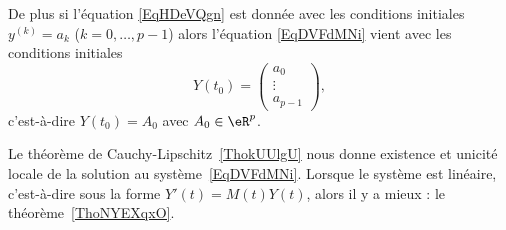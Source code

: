 De plus si l'équation \eqref{EqHDeVQgn} est donnée avec les conditions initiales \( y^{(k)}=a_k\) (\( k=0,\ldots, p-1\)) alors l'équation \eqref{EqDVFdMNi} vient avec les conditions initiales
\begin{equation}
	Y(t_0)=\begin{pmatrix}
		a_0    \\
		\vdots \\
		a_{p-1}
	\end{pmatrix},
\end{equation}
c'est-à-dire \( Y(t_0)=A_0\) avec \( A_0\in \eR^p\).

Le théorème de Cauchy-Lipschitz~\ref{ThokUUlgU} nous donne existence et unicité locale de la solution au système~\ref{EqDVFdMNi}. Lorsque le système est linéaire, c'est-à-dire sous la forme \( Y'(t)=M(t)Y(t)\), alors il y a mieux : le théorème~\ref{ThoNYEXqxO}.

